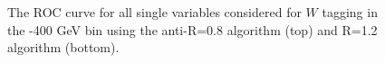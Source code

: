 %

\begin{figure}
\begin{center}
\caption{The ROC curve for all single variables considered for $W$
tagging in the -400 GeV bin using the anti-\kT R=0.8 algorithm
(top) and R=1.2 algorithm (bottom).}
\label{fig:pt300_single}
\end{center}
\end{figure}


